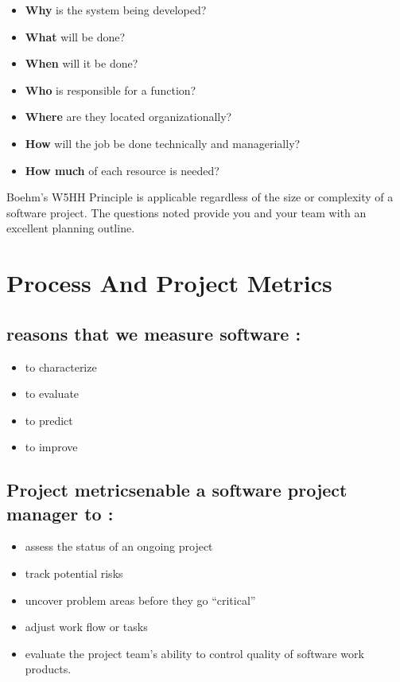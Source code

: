 \documentclass[12pt]{article}
\begin{document}
\begin{itemize}
	\item \textbf{Why} is the system being developed?
	\item \textbf{What} will be done?
	\item \textbf{When} will it be done?
	\item \textbf{Who} is responsible for a function?
	\item \textbf{Where} are they located organizationally?
	\item \textbf{How} will the job be done technically and managerially?
	\item \textbf{How much} of each resource is needed?
\end{itemize}


Boehm’s W5HH Principle is applicable regardless of the size or complexity of a software project. The questions noted provide you and your team with an excellent
planning outline.




\section{Process And Project Metrics}


\subsection{reasons that we measure software : }


\begin{itemize}
	\item to characterize
	\item to evaluate
	\item to predict
	\item to improve
\end{itemize}


\subsection{Project metricsenable a software project manager to : }


\begin{itemize}
	\item assess the status of an ongoing project
	\item track potential risks
	\item uncover problem areas before
they go “critical”
	\item adjust work flow or tasks
	\item evaluate the project team’s
ability to control quality of software work products.
\end{itemize}
\end{document}
